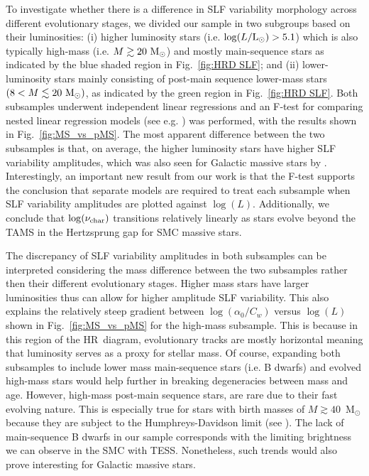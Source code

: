 \documentclass[fleqn,usenatbib]{mnras}
\begin{document}
To investigate whether there is a difference in SLF variability morphology across different evolutionary stages, we divided our sample in two subgroups based on their luminosities: (i) higher luminosity stars (i.e. $\log(L/{\rm L_{\odot}}) > 5.1$) which is also typically high-mass (i.e. $M \gtrsim 20~{\rm M}_{\odot}$) and mostly main-sequence stars as indicated by the blue shaded region in Fig.~\ref{fig:HRD SLF}; and (ii) lower-luminosity stars mainly consisting of post-main sequence lower-mass stars $(8 < M \lesssim 20~{\rm M}_{\odot})$, as indicated by the green region in Fig.~\ref{fig:HRD SLF}. Both subsamples underwent independent linear regressions and an F‑test for comparing nested linear regression models (see e.g. \citealt{book_stats}) was performed, with the results shown in Fig.~\ref{fig:MS_vs_pMS}.
The most apparent difference between the two subsamples is that, on average, the higher luminosity stars have higher SLF variability amplitudes, which was also seen for Galactic massive stars by \citet{Bowman+2020aa}. Interestingly, an important new result from our work is that the F-test supports the conclusion that separate models are required to treat each subsample when SLF variability amplitudes are plotted against $\log(L)$. Additionally, we conclude that $\log(\nu_{\rm char})$ transitions relatively linearly as stars evolve beyond the TAMS in the Hertzsprung gap for SMC massive stars. 

The discrepancy of SLF variability amplitudes in both subsamples can be interpreted considering the mass difference between the two subsamples rather then their different evolutionary stages. Higher mass stars have larger luminosities  thus can allow for higher amplitude SLF variability. This also explains the relatively steep gradient between $\log(\alpha_0/C_w)$ versus $\log(L)$ shown in Fig.~\ref{fig:MS_vs_pMS} for the high-mass subsample. This is because in this region of the HR~diagram, evolutionary tracks are mostly horizontal meaning that luminosity serves as a proxy for stellar mass. 
Of course, expanding both subsamples to include lower mass main-sequence stars (i.e. B dwarfs) and evolved high-mass stars would help further in breaking degeneracies between mass and age. However, high-mass post-main sequence stars, are rare due to their fast evolving nature. This is especially true for stars with birth masses of $M \gtrsim 40$~M$_{\odot}$ because they are subject to the Humphreys-Davidson limit (see \citealt{Humphreys+1979}). 
The lack of main-sequence B dwarfs in our sample corresponds with the limiting brightness we can observe in the SMC with TESS. Nonetheless, such trends would also prove interesting for Galactic massive stars. 
\end{document}

